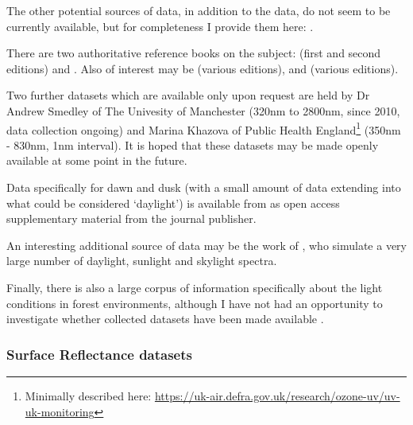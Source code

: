 The other potential sources of data, in addition to the \citet{judd_spectral_1964} data, do not seem to be currently available, but for completeness I provide them here: \citet{condit_spectral_1964, tarrant_spectral_1968, dicarlo_illuminant_2000, taylor_distribution_1941, henderson_spectral_1964, sastri_typical_1968, dixon_spectral_1978, sastri_spectral_1966,williams_statistical_2009,bui_group_2004}.

There are two authoritative reference books on the subject: \citet{henderson_daylight_1970,henderson_daylight_1977} (first and second editions) and \cite{robinson_solar_1966}. Also of interest may be \citet{minnaert_light_1993} (various editions), and \citet{lynch_color_2001} (various editions).

Two further datasets which are available only upon request are held by Dr Andrew Smedley of The Univesity of Manchester (320nm to 2800nm, since 2010, data collection ongoing) and Marina Khazova of Public Health England\footnote{Minimally described here: \url{https://uk-air.defra.gov.uk/research/ozone-uv/uv-uk-monitoring}} (350nm - 830nm, 1nm interval). It is hoped that these datasets may be made openly available at some point in the future.

Data specifically for dawn and dusk (with a small amount of data extending into what could be considered `daylight') is available from \citet{spitschan_variation_2016} as open access supplementary material from the journal publisher. 

An interesting additional source of data may be the work of \citet{peyvandi_colorimetric_2016}, who simulate a very large number of daylight, sunlight and skylight spectra. 

Finally, there is also a large corpus of information specifically about the light conditions in forest environments, although I have not had an opportunity to investigate whether collected datasets have been made available \citep{sumner_catarrhine_2000,chiao_characterization_2000,federer_spectral_1966,geiger_climate_2003,thery_forest_2001,xu_changes_2013,wang_real-time_2006,endler_color_1993,brinkmann_light_1971,de_castro_light_2000,freyman_spectral_1968,fassnacht_review_2016,blackburn_seasonal_1995}.


\subsubsection{Surface Reflectance datasets}

